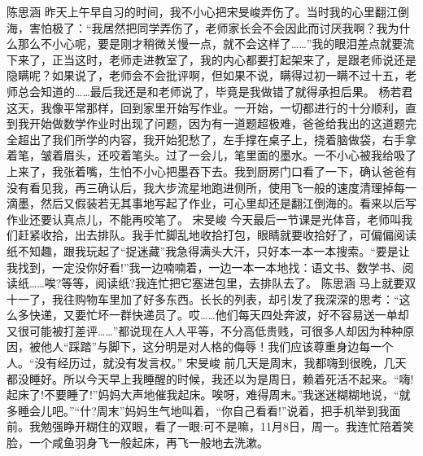 {}\markdownRendererInterblockSeparator
{}陈思涵\markdownRendererInterblockSeparator
{}昨天上午早自习的时间，我不小心把宋旻峻弄伤了。当时我的心里翻江倒海，害怕极了：“我居然把同学弄伤了，老师家长会不会因此而讨厌我啊？我为什么那么不小心呢，要是刚才稍微关慢一点，就不会这样了……”我的眼泪差点就要流下来了，正当这时，老师走进教室了，我的内心都要打起架来了，是跟老师说还是隐瞒呢？如果说了，老师会不会批评啊，但如果不说，瞒得过初一瞒不过十五，老师总会知道的……最后我还是和老师说了，毕竟是我做错了就得承担后果。\markdownRendererInterblockSeparator
{}\markdownRendererInterblockSeparator
{}杨若君\markdownRendererInterblockSeparator
{}这天，我像平常那样，回到家里开始写作业。一开始，一切都进行的十分顺利，直到我开始做数学作业时出现了问题，因为有一道题超极难，爸爸给我出的这道题完全超出了我们所学的内容，我开始犯愁了，左手撑在桌子上，挠着脑做袋，右手拿着笔，皱着眉头，还咬着笔头。过了一会儿，笔里面的墨水。一不小心被我给吸了上来了，我张着嘴，生怕不小心把墨吞下去。我到厨房门口看了一下，确认爸爸有没有看见我，再三确认后，我大步流星地跑进侧所，使用飞一般的速度清理掉每一滴墨，然后又假装若无其事地写起了作业，可心里却还是翻江倒海的。看来以后写作业还要认真点儿，不能再咬笔了。 \markdownRendererInterblockSeparator
{}\markdownRendererInterblockSeparator
{}宋旻峻\markdownRendererInterblockSeparator
{}今天最后一节课是光体音，老师叫我们赶紧收拾，出去排队。我手忙脚乱地收拾打包，眼睛就要收拾好了，可偏偏阅读纸不知趣，跟我玩起了“捉迷藏”我急得满头大汗，只好本一本一本搜索。“要是让我找到，一定没你好看!”我一边喃喃着，一边一本一本地找：语文书、数学书、阅读纸……唉?等等，阅读纸?我连忙把它塞进包里，去排队去了。 \markdownRendererInterblockSeparator
{}\markdownRendererInterblockSeparator
{}陈思涵\markdownRendererInterblockSeparator
{}马上就要双十一了，我往购物车里加了好多东西。长长的列表，却引发了我深深的思考：“这么多快递，又要忙坏一群快递员了。哎……他们每天四处奔波，好不容易送一单却又很可能被打差评……”都说现在人人平等，不分高低贵贱，可很多人却因为种种原因，被他人“踩踏”与脚下，这分明是对人格的侮辱！我们应该尊重身边每一个人。“没有经历过，就没有发言权。”\markdownRendererInterblockSeparator
{}\markdownRendererInterblockSeparator
{}宋旻峻\markdownRendererInterblockSeparator
{}前几天是周末，我都嗨到很晚，几天都没睡好。所以今天早上我睡醒的时候，我还以为是周日，赖着死活不起来。“嗨!起床了!不要睡了!”妈妈大声地催我起床。唉呀，难得周末。”我迷迷糊糊地说，“就多睡会儿吧。”“什?周末”妈妈生气地叫着，“你自己看看!”说着，把手机举到我面前。我勉强睁开糊住的双眼，看了一眼:可不是嘛，11月8日，周一。我连忙陪着笑脸，一个咸鱼羽身飞一般起床，再飞一般地去洗漱。\markdownRendererInterblockSeparator
